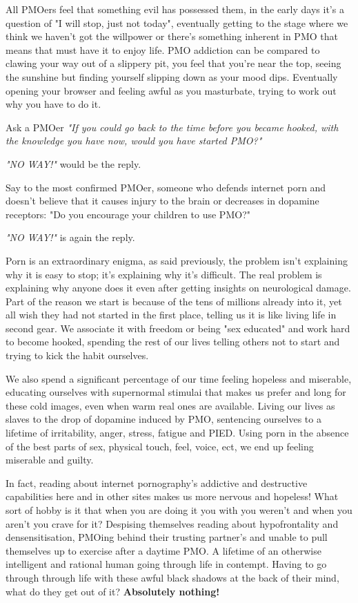 \documentclass[easypeasy.tex]{subfiles}
\begin{document}
All PMOers feel that something evil has possessed them, in the early days it's a question of "I will stop, just not today", eventually getting to the stage where we think we haven't got the willpower or there's something inherent in PMO that means that must have it to enjoy life. PMO addiction can be compared to clawing your way out of a slippery pit, you feel that you're near the top, seeing the sunshine but finding yourself slipping down as your mood dips. Eventually opening your browser and feeling awful as you masturbate, trying to work out why you have to do it.

Ask a PMOer \textit{"If you could go back to the time before you became hooked, with the knowledge you have now, would you have started PMO?"}

\textit{"NO WAY!"} would be the reply.

Say to the most confirmed PMOer, someone who defends internet porn and doesn't believe that it causes injury to the brain or decreases in dopamine receptors: "Do you encourage your children to use PMO?"

\textit{"NO WAY!"} is again the reply.

Porn is an extraordinary enigma, as said previously, the problem isn't explaining why it is easy to stop; it's explaining why it's difficult. The real problem is explaining why anyone does it even after getting insights on neurological damage. Part of the reason we start is because of the tens of millions already into it, yet all wish they had not started in the first place, telling us it is like living life in second gear. We associate it with freedom or being "sex educated" and work hard to become hooked, spending the rest of our lives telling others not to start and trying to kick the habit ourselves.

We also spend a significant percentage of our time feeling hopeless and miserable, educating ourselves with supernormal stimulai that makes us prefer and long for these cold images, even when warm real ones are available. Living our lives as slaves to the drop of dopamine induced by PMO, sentencing ourselves to a lifetime of irritability, anger, stress, fatigue and PIED. Using porn in the absence of the best parts of sex, physical touch, feel, voice, ect, we end up feeling miserable and guilty.

In fact, reading about internet pornography's addictive and destructive capabilities here and in other sites makes us more nervous and hopeless! What sort of hobby is it that when you are doing it you with you weren't and when you aren't you crave for it? Despising themselves reading about hypofrontality and densensitisation, PMOing behind their trusting partner's and unable to pull themselves up to exercise after a daytime PMO. A lifetime of an otherwise intelligent and rational human going through life in contempt. Having to go through through life with these awful black shadows at the back of their mind, what do they get out of it? \textbf{Absolutely nothing!}
\end{document}
